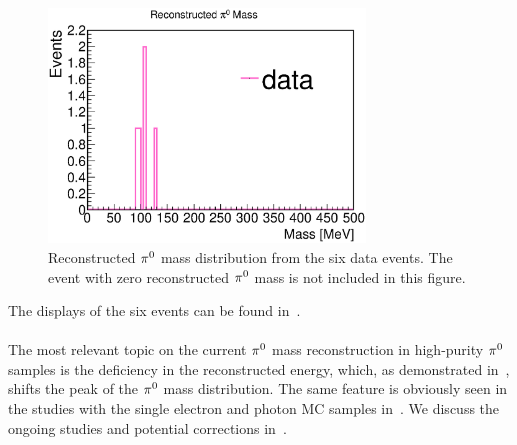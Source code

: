 \begin{figure}[htbp]
\begin{center}
\includegraphics[width=0.75\textwidth]{figs/datapi0/data/RecoPi0Mass.eps}
\caption{Reconstructed ${\pi}^0$ mass distribution from the six data events.
The event with zero reconstructed ${\pi}^0$ mass is not included in this
figure.}
\label{fig:mpi0_data}
\end{center}
\end{figure}



The displays of the six events can be found in~.\\
\\
The most relevant topic on the current ${\pi}^0$ mass reconstruction
in high-purity ${\pi}^0$ samples is the deficiency in the reconstructed
energy, which, as demonstrated in~,
shifts the peak of the ${\pi}^0$ mass distribution.
The same feature is obviously seen in the studies with the single electron
and photon MC samples in~.
We discuss the ongoing studies and potential corrections in~.\\



